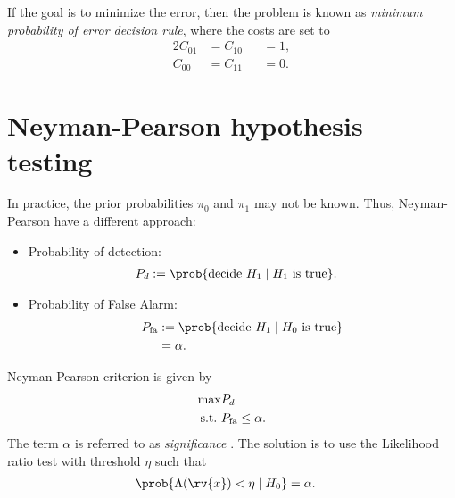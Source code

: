 If the goal is to minimize the error, then the problem is known as \emph{minimum probability of error decision rule}, where the costs are set to
\begin{alignat}{2}
    C_{01} &= C_{10} &&= 1,\\
    C_{00} &= C_{11} &&= 0.
\end{alignat}

\section{Neyman-Pearson hypothesis testing}
In practice, the prior probabilities $\pi_{0}$ and $\pi_{1}$ may not be known. Thus, Neyman-Pearson have a different approach:
\begin{itemize}
    \item Probability of detection: 
    \begin{align}
        \symProb_{d} &:= \prob{\text{decide } H_{1} \mid H_{1} \text{ is true}}.
    \end{align}
    \item Probability of False Alarm: 
    \begin{align}
        \symProb_{\mathrm{fa}} &:= \prob{\text{decide } H_{1} \mid H_{0} \text{ is true}}\\
        &= \alpha.
    \end{align}
\end{itemize}
Neyman-Pearson criterion is given by
\begin{align}
    \max &P_{d}\\
    \mathrm{s.t.}~ &P_{\mathrm{fa}}\leq\alpha.
\end{align}
The term $\alpha$ is referred to as \emph{significance} \cite{liCommonFallaciesApplying2008}.
The solution is to use the Likelihood ratio test with threshold $\eta$ such that
\begin{align}
    \prob{\Lambda(\rv{x}) < \eta \mid H_{0}} &= \alpha.
\end{align}

